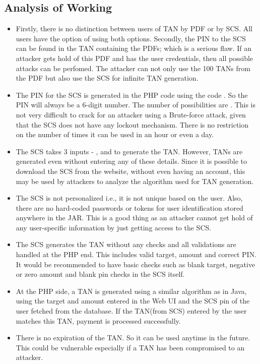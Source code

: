 \subsection{Analysis of Working}
\begin{itemize}

\item Firstly, there is no distinction between users of TAN by PDF or by SCS. All users have the option of using both options. Secondly, the PIN to the SCS can be found in the TAN containing the PDFs; which is a serious flaw. If an attacker gets hold of this PDF and has the user credentials, then all possible attacks can be perfomed. The attacker can not only use the 100 TANs from the PDF but also use the SCS for infinite TAN generation.
\item The PIN for the SCS is generated in the PHP code using the code . So the PIN will always be a 6-digit number. The number of possibilities are . This is not very difficult to crack for an attacker using a Brute-force attack, given that the SCS does not have any lockout mechanism. There is no restriction on the number of times it can be used in an hour or even a day.
\item The SCS takes 3 inputs - ,  and  to generate the TAN. However, TANs are generated even without entering any of these details. Since it is possible to download the SCS from the website, without even having an account, this may be used by attackers to analyze the algorithm used for TAN generation.
\item The SCS is not personalized i.e., it is not unique based on the user. Also, there are no hard-coded passwords or tokens for user identification stored anywhere in the JAR. This is a good thing as an attacker cannot get hold of any user-specific information by just getting access to the SCS.
\item The SCS generates the TAN without any checks and all validations are handled at the PHP end. This includes valid target, amount and correct PIN. It would be recommended to have basic checks such as blank target, negative or zero amount and blank pin checks in the SCS itself.
\item At the PHP side, a TAN is generated using a similar algorithm as in Java, using the target and amount entered in the Web UI and the SCS pin of the user fetched from the database. If the TAN(from SCS) entered by the user matches this TAN, payment is processed successfully.
\item There is no expiration of the TAN. So it can be used anytime in the future. This could be vulnerable especially if a TAN has been compromised to an attacker.

\end{itemize}